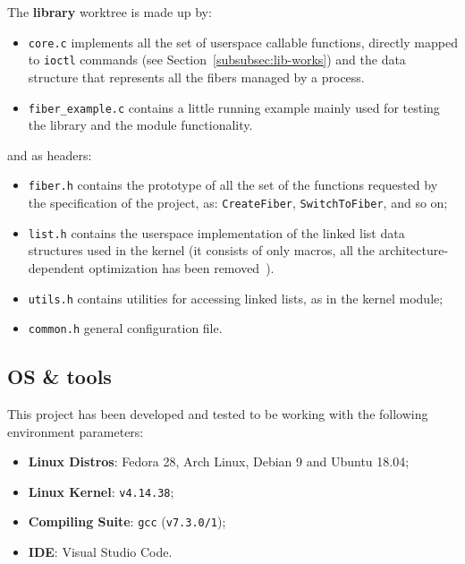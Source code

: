 \documentclass[a4paper,10pt]{article}
\begin{document}
  The \textbf{library} worktree is made up by:
  \begin{itemize}
    \item \lstinline{core.c} implements all the set of userspace callable functions, directly mapped to \lstinline{ioctl} commands (see Section~\ref{subsubsec:lib-works}) and the data structure that represents all the fibers managed by a process.
    \item \lstinline{fiber_example.c} contains a little running example mainly used for testing the library and the module functionality.
  \end{itemize}
  and as headers:
  \begin{itemize}
    \item \lstinline{fiber.h} contains the prototype of all the set of the functions requested by the specification of the project, as: \lstinline{CreateFiber}, \lstinline{SwitchToFiber}, and so on;
    \item \lstinline{list.h} contains the userspace implementation of the linked list data structures used in the kernel (it consists of only macros, all the architecture-dependent optimization has been removed~\cite{klists}).
    \item \lstinline{utils.h} contains utilities for accessing linked lists, as in the kernel module;
    \item \lstinline{common.h} general configuration file.
  \end{itemize}


\subsection{OS \& tools}
  This project has been developed and tested to be working with the following environment parameters:
  \begin{itemize}
    \item \textbf{Linux Distros}: Fedora 28, Arch Linux, Debian 9 and Ubuntu 18.04;
    \item \textbf{Linux Kernel}: \lstinline{v4.14.38};
    \item \textbf{Compiling Suite}: \lstinline{gcc} (\lstinline{v7.3.0/1});
    \item \textbf{IDE}: Visual Studio Code.
  \end{itemize}
\end{document}
